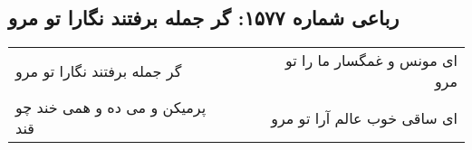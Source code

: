 \begin{center}
\section*{رباعی شماره ۱۵۷۷: گر جمله برفتند نگارا تو مرو}
\label{sec:1577}
\begin{longtable}{l p{0.5cm} r}
گر جمله برفتند نگارا تو مرو
&&
ای مونس و غمگسار ما را تو مرو
\\
پرمیکن و می ده و همی خند چو قند
&&
ای ساقی خوب عالم آرا تو مرو
\\
\end{longtable}
\end{center}

